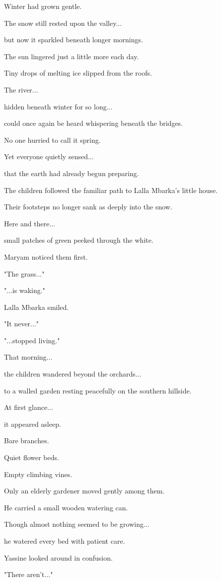 \documentclass[12pt,openany]{book}
\begin{document}
Winter had grown gentle.

The snow still rested upon the valley...

but now it sparkled beneath longer mornings.

The sun lingered just a little more each day.

Tiny drops of melting ice slipped from the roofs.

The river...

hidden beneath winter for so long...

could once again be heard whispering beneath the bridges.

No one hurried to call it spring.

Yet everyone quietly sensed...

that the earth had already begun preparing.

The children followed the familiar path to Lalla Mbarka's little house.

Their footsteps no longer sank as deeply into the snow.

Here and there...

small patches of green peeked through the white.

Maryam noticed them first.

"The grass..."

"...is waking."

Lalla Mbarka smiled.

"It never..."

"...stopped living."

That morning...

the children wandered beyond the orchards...

to a walled garden resting peacefully on the southern hillside.

At first glance...

it appeared asleep.

Bare branches.

Quiet flower beds.

Empty climbing vines.

Only an elderly gardener moved gently among them.

He carried a small wooden watering can.

Though almost nothing seemed to be growing...

he watered every bed with patient care.

Yassine looked around in confusion.

"There aren't..."
\end{document}
